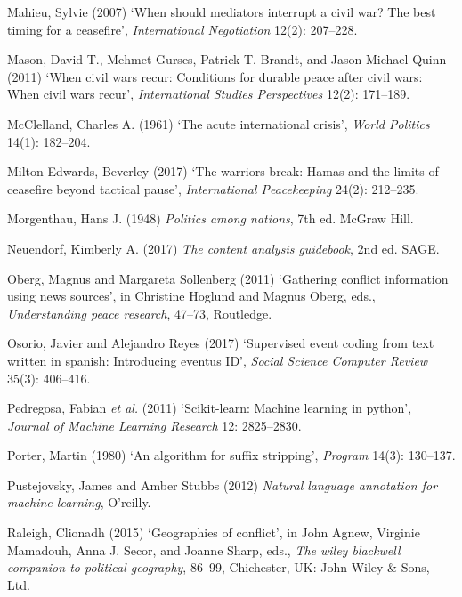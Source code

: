 \documentclass[12pt,twoside]{reedthesis}
\begin{document}
\hypertarget{ref-mahieu_when_2007}{}
Mahieu, Sylvie (2007) `When should mediators interrupt a civil war? The
best timing for a ceasefire', \emph{International Negotiation} 12(2):
207--228.

\hypertarget{ref-mason_when_2011}{}
Mason, David T., Mehmet Gurses, Patrick T. Brandt, and Jason Michael
Quinn (2011) `When civil wars recur: Conditions for durable peace after
civil wars: When civil wars recur', \emph{International Studies
Perspectives} 12(2): 171--189.

\hypertarget{ref-mcclelland_acute_1961}{}
McClelland, Charles A. (1961) `The acute international crisis',
\emph{World Politics} 14(1): 182--204.

\hypertarget{ref-milton-edwards_warriors_2017}{}
Milton-Edwards, Beverley (2017) `The warriors break: Hamas and the
limits of ceasefire beyond tactical pause', \emph{International
Peacekeeping} 24(2): 212--235.

\hypertarget{ref-morgenthau_politics_1948}{}
Morgenthau, Hans J. (1948) \emph{Politics among nations}, 7th ed. McGraw
Hill.

\hypertarget{ref-neuendorf_content_2017}{}
Neuendorf, Kimberly A. (2017) \emph{The content analysis guidebook}, 2nd
ed. SAGE.

\hypertarget{ref-oberg_gathering_2011}{}
Oberg, Magnus and Margareta Sollenberg (2011) `Gathering conflict
information using news sources', in Christine Hoglund and Magnus Oberg,
eds., \emph{Understanding peace research}, 47--73, Routledge.

\hypertarget{ref-osorio_supervised_2017}{}
Osorio, Javier and Alejandro Reyes (2017) `Supervised event coding from
text written in spanish: Introducing eventus ID', \emph{Social Science
Computer Review} 35(3): 406--416.

\hypertarget{ref-pedregosa_scikit-learn:_2011}{}
Pedregosa, Fabian \emph{et al.} (2011) `Scikit-learn: Machine learning
in python', \emph{Journal of Machine Learning Research} 12: 2825--2830.

\hypertarget{ref-porter_algorithm_1980}{}
Porter, Martin (1980) `An algorithm for suffix stripping',
\emph{Program} 14(3): 130--137.

\hypertarget{ref-pustejovsky_natural_2012}{}
Pustejovsky, James and Amber Stubbs (2012) \emph{Natural language
annotation for machine learning}, O'reilly.

\hypertarget{ref-raleigh_geographies_2015}{}
Raleigh, Clionadh (2015) `Geographies of conflict', in John Agnew,
Virginie Mamadouh, Anna J. Secor, and Joanne Sharp, eds., \emph{The
wiley blackwell companion to political geography}, 86--99, Chichester,
UK: John Wiley \& Sons, Ltd.
\end{document}
